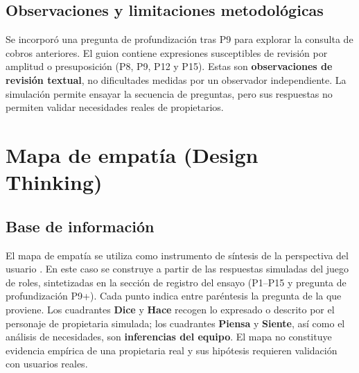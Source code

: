\documentclass[12pt,a4paper]{article}
\begin{document}
\subsection{Observaciones y limitaciones metodológicas}
Se incorporó una pregunta de profundización tras P9 para explorar la consulta de cobros anteriores. El guion contiene expresiones susceptibles de revisión por amplitud o presuposición (P8, P9, P12 y P15). Estas son \textbf{observaciones de revisión textual}, no dificultades medidas por un observador independiente. La simulación permite ensayar la secuencia de preguntas, pero sus respuestas no permiten validar necesidades reales de propietarios.

\section{Mapa de empatía (Design Thinking)}
\subsection{Base de información}
El mapa de empatía se utiliza como instrumento de síntesis de la perspectiva del usuario \cite{ixdf}. En este caso se construye a partir de las respuestas simuladas del juego de roles, sintetizadas en la sección de registro del ensayo (P1--P15 y pregunta de profundización P9+). Cada punto indica entre paréntesis la pregunta de la que proviene. Los cuadrantes \textbf{Dice} y \textbf{Hace} recogen lo expresado o descrito por el personaje de propietaria simulada; los cuadrantes \textbf{Piensa} y \textbf{Siente}, así como el análisis de necesidades, son \textbf{inferencias del equipo}. El mapa no constituye evidencia empírica de una propietaria real y sus hipótesis requieren validación con usuarios reales.
\end{document}
